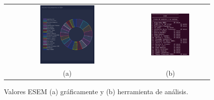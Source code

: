 \documentclass[a4paper, 12pt]{book}
\begin{document}
\begin{figure}[!h]
    \centering
    \begin{tabular}{cc}
    \includegraphics[width=0.45\textwidth]{img/esem_all_graph.png} &  
    \includegraphics[width=0.52\textwidth]{img/esen_all.png} \\ 
    (a) &(b) 
    \end{tabular}
    \caption{Valores ESEM (a) gráficamente y (b) herramienta de análisis.}
    \label{fig:comp_esem_all}
\end{figure}
\end{document}
